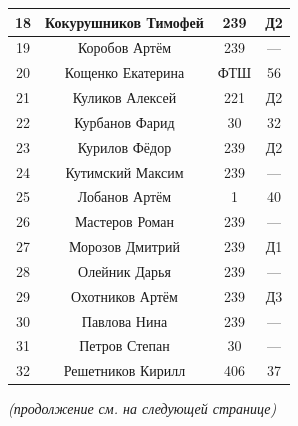 \documentclass[12pt]{article}
\newlength{\h}
\newlength{\x}
\begin{document}
\begin{table}[ht]
\begin{minipage}[t]{0.48\linewidth}
\begin{tabular}[h]{|c|c|c|c|}
      18 & Кокурушников Тимофей & 239 & Д2  \\ \hline
      19 & Коробов Артём & 239 & ---  \\ \hline
      20 & Кощенко Екатерина & ФТШ & 56  \\ \hline
      21 & Куликов Алексей & 221 & Д2  \\ \hline
      22 & Курбанов Фарид & 30 & 32  \\ \hline
      23 & Курилов Фёдор & 239 & Д2  \\ \hline
      24 & Кутимский Максим & 239 & ---  \\ \hline
      25 & Лобанов Артём & 1 & 40  \\ \hline
      26 & Мастеров Роман & 239 & ---  \\ \hline
      27 & Морозов Дмитрий & 239 & Д1  \\ \hline
      28 & Олейник Дарья & 239 & ---  \\ \hline
      29 & Охотников Артём & 239 & Д3  \\ \hline
      30 & Павлова Нина & 239 & ---  \\ \hline
      31 & Петров Степан & 30 & ---  \\ \hline
      32 & Решетников Кирилл & 406 & 37  \\ \hline
    \end{tabular}
  \end{minipage}
\end{table}

\begin{center}
\textit{(продолжение см. на следующей странице)}  
\end{center}


\clearpage
\end{document}
